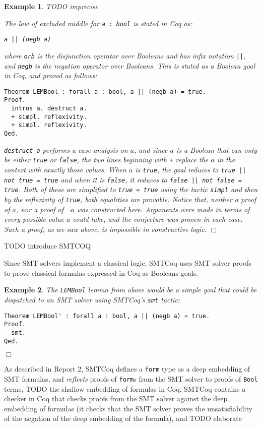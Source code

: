 \documentclass[11pt]{article}
\newtheorem{example}{Example}[section]
\begin{document}
	\begin{example}
		TODO imprecise
		
		\em The law of 
		excluded middle for 
		\texttt{a : bool} is 
		stated in Coq as: 
		\begin{center}
			\texttt{a || (negb a)}
		\end{center}
		where \texttt{orb} is the 
		disjunction operator over 
		Booleans and has 
		infix notation \texttt{||},
		and \texttt{negb} is the 
		negation operator over 
		Booleans.
		This is stated as a Boolean
		goal in Coq, and proved as follows:
		\begin{verbatim}
Theorem LEMBool : forall a : bool, a || (negb a) = true.
Proof.
  intros a. destruct a.
  + simpl. reflexivity.
  + simpl. reflexivity.
Qed.
		\end{verbatim}
		\texttt{destruct a} performs a 
		case analysis on $a$, and since $a$ 
		is a Boolean that can 
		only be either \texttt{true}
		or \texttt{false}, the two lines
		beginning with \texttt{+} 
		replace the $a$ in the context
		with exactly those values.
		When $a$ is \texttt{true}, the 
		goal reduces to 
		\texttt{true || not true = true}
		and when it is \texttt{false}, it
		reduces to 
		\texttt{false || not false = true}.
		Both of these are simplified to 
		\texttt{true = true} using the 
		tactic \texttt{simpl} and then 
		by the reflexivity of 
		\texttt{true}, both equalities
		are provable. Notice that, 
		neither a proof of $a$, nor 
		a proof of $\neg a$ was 
		constructed here. Arguments were
		made in terms of every possible 
		value $a$ could take, and the
		conjecture was proven in 
		each case. Such a proof, as we 
		saw above, is impossible in 
		constructive logic.
		\hfill$\Box$
	\end{example}
	TODO introduce SMTCOQ
	
	Since SMT solvers implement 
	a classical logic, SMTCoq 
	uses SMT solver proofs to 
	prove classical formulas 
	expressed in Coq as Booleans
	goals. 
	
	\begin{example}
		\em The \texttt{LEMBool} lemma from 
		above would be a simple goal that 
		could be dispatched to an SMT 
		solver using SMTCoq's \texttt{smt}
		tactic:
		\begin{verbatim}
Theorem LEMBool' : forall a : bool, a || (negb a) = true.
Proof.
  smt.
Qed.
		\end{verbatim}
		\hfill$\Box$
	\end{example}
	As described in Report 2, 
	SMTCoq defines a \texttt{form} type
	as a deep embedding of 
	SMT formulas, 
	and \textit{reflects} 
	proofs of \texttt{form}s from the SMT 
	solver to proofs of \texttt{Bool} 
	terms, 
	TODO 
	the shallow embedding of formulas 
	in Coq. SMTCoq contains a checker in Coq 
	that checks 
	proofs from the SMT solver against
	the deep embedding of formulas
	(it checks that the SMT solver proves 
	the unsatisfiability of the negation
	of the deep embedding of the formula), and 
	TODO elaborate
	
\end{document}
